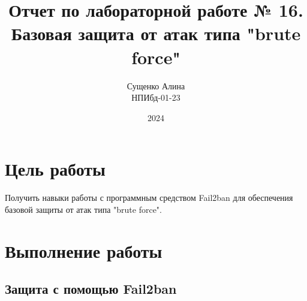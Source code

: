 

\title{Отчет по лабораторной работе № 16. \\ Базовая защита от атак типа "brute force"}
\author{Сущенко Алина\\ НПИбд-01-23}
\date{2024}



\maketitle
\newpage

\tableofcontents

\newpage
\section{Цель работы}
Получить навыки работы с программным средством Fail2ban для обеспечения базовой защиты от атак типа "brute force".

\newpage
\section{Выполнение работы}
\subsection{Защита с помощью Fail2ban}

